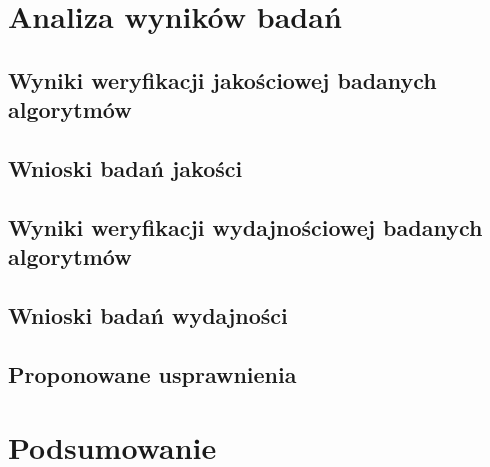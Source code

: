 \chapter{Analiza wyników badań}\label{Chapter_AnalizaRezultatow}

  \section{Wyniki weryfikacji jakościowej badanych algorytmów}\label{Section_Quality}

  \section{Wnioski badań jakości}\label{Section_QualityWnioski}

  \section{Wyniki weryfikacji wydajnościowej badanych algorytmów}\label{Section_Performance}

  \section{Wnioski badań wydajności}\label{Section_PerformanceWnioski}

  \section{Proponowane usprawnienia}\label{Section_Usprawnienia}
    \cite{HandOverFaceOcclusion07}

\chapter{Podsumowanie}\label{Section_Podsumowanie}